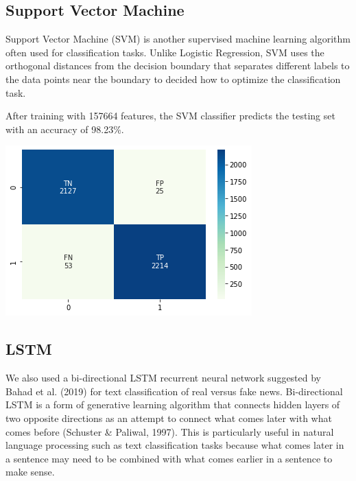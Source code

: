 \documentclass{article}
\begin{document}
\begin{multicols}{2}
\subsection{Support Vector Machine}
Support Vector Machine (SVM) is another supervised machine learning algorithm often used for classification tasks. Unlike Logistic Regression, SVM uses the orthogonal distances from the decision boundary that separates different labels to the data points near the boundary to decided how to optimize the classification task. 

After training with 157664 features, the SVM classifier predicts the testing set with an accuracy of 98.23\%.

\begin{center}
\includegraphics[scale=0.45]{images/svmcm.png}
\end{center}

\subsection{LSTM}
We also used a bi-directional LSTM recurrent neural network suggested by Bahad et al. (2019) for text classification of real versus fake news. Bi-directional LSTM is a form of generative learning algorithm that connects hidden layers of two opposite directions as an attempt to connect what comes later with what comes before (Schuster \& Paliwal, 1997). This is particularly useful in natural language processing such as text classification tasks because what comes later in a sentence may need to be combined with what comes earlier in a sentence to make sense.


\end{multicols}
\end{document}
